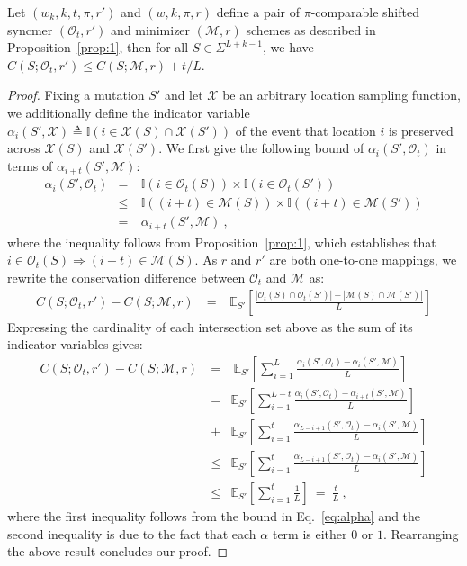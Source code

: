 \begin{corollary} 
 Let $(w_k,k,t,\pi, r')$ and $(w,k, \pi,r)$ define a pair of $\pi$-comparable shifted syncmer $(\mathcal{O}_t, r')$ and minimizer $(\mathcal{M}, r)$ schemes as described in Proposition~\ref{prop:1}, then for all $S \in \Sigma^{L+k-1}$, we have
$C(S; \mathcal{O}_t, r') \leq  C(S; \mathcal{M}, r) + t/L$.
\begin{proof}
Fixing a mutation $S'$ and let $\mathcal{X}$ be an arbitrary location sampling function, we additionally define the indicator variable $\alpha_i(S', \mathcal{X}) \triangleq \mathbb{I}(i \in \mathcal{X}(S)\cap\mathcal{X}(S'))$ of the event that location $i$ is preserved across $\mathcal{X}(S)$ and $\mathcal{X}(S')$. We first give the following bound of $\alpha_i(S',\mathcal{O}_t)$ in terms of $\alpha_{i+t}(S',\mathcal{M})$:
\begin{eqnarray}
\alpha_i(S', \mathcal{O}_t) &=& \ \mathbb{I}(i \in \mathcal{O}_t(S))\times \mathbb{I}(i \in \mathcal{O}_t(S')) \nonumber \\
\ &\leq& \ \mathbb{I}((i + t) \in \mathcal{M}(S)) \times \mathbb{I}((i + t) \in \mathcal{M}(S')) \nonumber \\
\ &=& \ \alpha_{i+t}(S', \mathcal{M}) \ ,
\label{eq:alpha}
\end{eqnarray}
where the inequality follows from Proposition~\ref{prop:1}, which establishes that $i \in \mathcal{O}_t(S) \Rightarrow (i+t) \in \mathcal{M}(S)$. As $r$ and $r'$ are both one-to-one mappings, we rewrite the conservation difference between $\mathcal{O}_t$ and $\mathcal{M}$ as:
\begin{eqnarray}
C(S;\mathcal{O}_t,r') - C(S;\mathcal{M},r) 
\ &=& \ \mathbb{E}_{S'}\left[\frac{|\mathcal{O}_t(S)\cap\mathcal{O}_t(S')| - |\mathcal{M}(S)\cap\mathcal{M}(S')|}{L}\right] 
\end{eqnarray}
Expressing the cardinality of each intersection set above as the sum of its indicator variables gives:
\begin{eqnarray}
C(S;\mathcal{O}_t,r') - C(S;\mathcal{M},r)  \ &=& \ \mathbb{E}_{S'}\left[\sum_{i=1}^L \frac{\alpha_i(S', \mathcal{O}_t) - \alpha_i(S', \mathcal{M})}{L}\right] \nonumber \\
&=& \mathbb{E}_{S'}\left[\sum_{i=1}^{L-t} \frac{\alpha_i(S', \mathcal{O}_t) - \alpha_{i+t}(S', \mathcal{M})}{L}\right] \nonumber \\
&+& \mathbb{E}_{S'}\left[\sum_{i=1}^{t} \frac{\alpha_{L-i+1}(S', \mathcal{O}_t) - \alpha_i(S', \mathcal{M})}{L} \right] \nonumber \\
&\leq& \mathbb{E}_{S'}\left[\sum_{i=1}^{t} \frac{\alpha_{L-i+1}(S', \mathcal{O}_t) - \alpha_i(S', \mathcal{M})}{L} \right] 
\nonumber \\
&\leq& \mathbb{E}_{S'}\left[\sum_{i=1}^{t} \frac{1}{L} \right] \ = \ \frac{t}{L} \ ,
\end{eqnarray}
where the first inequality follows from the bound in Eq.~\eqref{eq:alpha} and the second inequality is due to the fact that each $\alpha$ term is either $0$ or $1$. Rearranging the above result concludes our proof.
\end{proof}
\label{cor:2}
\end{corollary}

